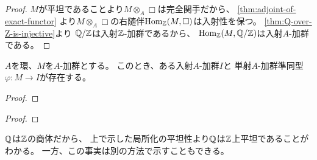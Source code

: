 \documentclass[report]{jlreq}
\begin{document}
\begin{proof}
    $M$が平坦であることより$M \otimes_A \Box$は完全関手だから、
    \cref{thm:adjoint-of-exact-functor}
    より$M \otimes_A \Box$の右随伴$\operatorname{Hom}_{\mathbb{Z}}(M, \Box)$は入射性を保つ。
    \cref{thm:Q-over-Z-is-injective}より
    $\mathbb{Q} / \mathbb{Z}$は入射$\mathbb{Z}$-加群であるから、
    $\operatorname{Hom}_{\mathbb{Z}}(M, \mathbb{Q} / \mathbb{Z})$は入射$A$-加群である。
\end{proof}

\begin{theorem}[入射加群への埋め込み]
    $A$を環、$M$を$A$-加群とする。
    このとき、ある入射$A$-加群$I$と
    単射$A$-加群準同型$\varphi \colon M \to I$が存在する。
\end{theorem}

\begin{proof}
    \TODO{}
\end{proof}


\begin{proof}
    \TODO{}
\end{proof}

$\mathbb{Q}$は$\mathbb{Z}$の商体だから、
上で示した局所化の平坦性より$\mathbb{Q}$は$\mathbb{Z}$上平坦であることがわかる。
一方、この事実は別の方法で示すこともできる。

\end{document}

